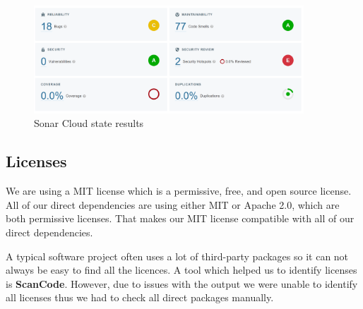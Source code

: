 \documentclass[10pt]{article}
\begin{document}
\begin{figure} [H]
  \centering
  \includegraphics[width=0.9\textwidth]{images/sonarcloud.png}
  \caption{Sonar Cloud state results}
  \label{fig:sc}
\end{figure}


\subsection{Licenses}
We are using a MIT license which is a permissive, free, and open source license. All of our direct dependencies are using either MIT or Apache 2.0, which are both permissive licenses. That makes our MIT license compatible with all of our direct dependencies. \par
A typical software project often uses a lot of third-party packages so it can not always be easy to find all the licences. A tool which helped us to identify licenses is  \textbf{ScanCode}. However, due to issues with the output we were unable to identify all licenses thus we had to check all direct packages manually. 
\end{document}
